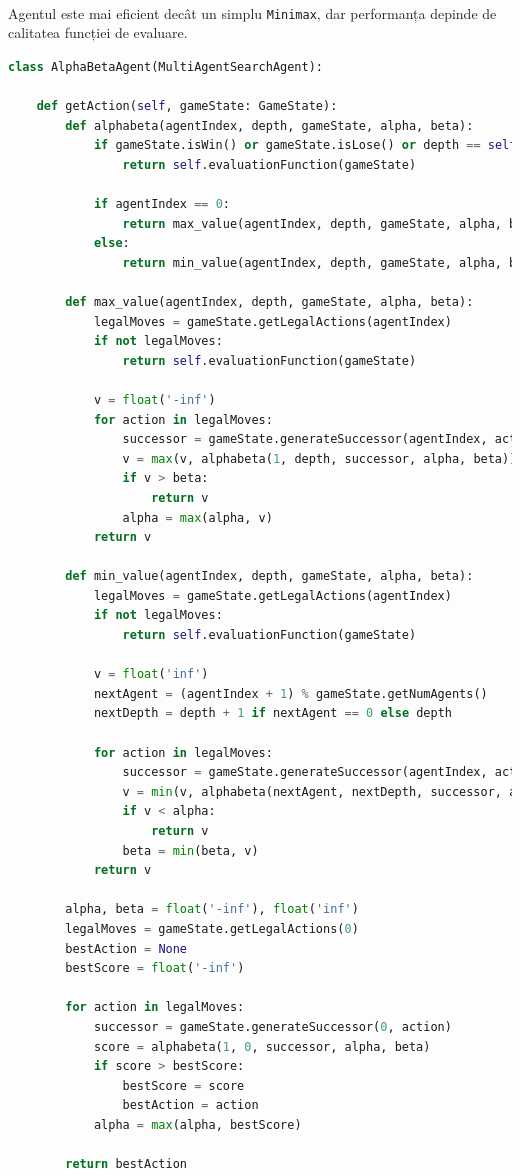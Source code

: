 \documentclass[12pt]{article}
\begin{document}
\paragraph{}Agentul este mai eficient decât un simplu \texttt{Minimax}, dar performanța depinde de calitatea funcției de evaluare.
	\begin{lstlisting}[language=Python]
class AlphaBetaAgent(MultiAgentSearchAgent):

    def getAction(self, gameState: GameState):
        def alphabeta(agentIndex, depth, gameState, alpha, beta):
            if gameState.isWin() or gameState.isLose() or depth == self.depth:
                return self.evaluationFunction(gameState)

            if agentIndex == 0:
                return max_value(agentIndex, depth, gameState, alpha, beta)
            else:
                return min_value(agentIndex, depth, gameState, alpha, beta)

        def max_value(agentIndex, depth, gameState, alpha, beta):
            legalMoves = gameState.getLegalActions(agentIndex)
            if not legalMoves:
                return self.evaluationFunction(gameState)

            v = float('-inf')
            for action in legalMoves:
                successor = gameState.generateSuccessor(agentIndex, action)
                v = max(v, alphabeta(1, depth, successor, alpha, beta))
                if v > beta:
                    return v
                alpha = max(alpha, v)
            return v

        def min_value(agentIndex, depth, gameState, alpha, beta):
            legalMoves = gameState.getLegalActions(agentIndex)
            if not legalMoves:
                return self.evaluationFunction(gameState)

            v = float('inf')
            nextAgent = (agentIndex + 1) % gameState.getNumAgents()
            nextDepth = depth + 1 if nextAgent == 0 else depth

            for action in legalMoves:
                successor = gameState.generateSuccessor(agentIndex, action)
                v = min(v, alphabeta(nextAgent, nextDepth, successor, alpha, beta))
                if v < alpha:
                    return v
                beta = min(beta, v)
            return v

        alpha, beta = float('-inf'), float('inf')
        legalMoves = gameState.getLegalActions(0)
        bestAction = None
        bestScore = float('-inf')

        for action in legalMoves:
            successor = gameState.generateSuccessor(0, action)
            score = alphabeta(1, 0, successor, alpha, beta)
            if score > bestScore:
                bestScore = score
                bestAction = action
            alpha = max(alpha, bestScore)

        return bestAction
    \end{lstlisting}
\end{document}
